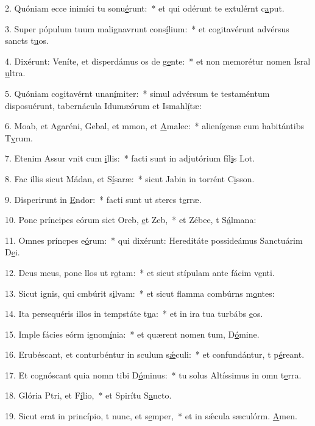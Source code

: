 2. Quóniam ecce inimíci tu sonu\uline{é}runt:~* et qui odérunt te extulérnt c\uline{a}put.\par 
3. Super pópulum tuum malignavrunt cons\uline{í}lium:~* et cogitavérunt advérsus sancts t\uline{u}os.\par 
4. Dixérunt: Veníte, et disperdámus os de g\uline{e}nte:~* et non memorétur nomen Isral \uline{u}ltra.\par 
5. Quóniam cogitavérnt unan\uline{í}miter:~* simul advérsum te testaméntum disposuérunt, tabernácula Idumæórum et Ismahl\uline{í}tæ:\par 
6. Moab, et Agaréni, Gebal, et mmon, et \uline{A}malec:~* alienígenæ cum habitántibs T\uline{y}rum.\par 
7. Etenim Assur vnit cum \uline{i}llis:~* facti sunt in adjutórium fíl\uline{i}s Lot.\par 
8. Fac illis sicut Mádan, et S\uline{í}saræ:~* sicut Jabin in torrént C\uline{i}sson.\par 
9. Disperirunt in \uline{E}ndor:~* facti sunt ut stercs t\uline{e}rræ.\par 
10. Pone príncipes eórum sict Oreb, \uline{e}t Zeb,~* et Zébee, t S\uline{á}lmana:\par 
11. Omnes príncpes e\uline{ó}rum:~* qui dixérunt: Hereditáte possideámus Sanctuárim D\uline{e}i.\par 
12. Deus meus, pone llos ut r\uline{o}tam:~* et sicut stípulam ante fácim v\uline{e}nti.\par 
13. Sicut ignis, qui cmbúrit s\uline{i}lvam:~* et sicut flamma combúrns m\uline{o}ntes:\par 
14. Ita persequéris illos in tempstáte t\uline{u}a:~* et in ira tua turbábs \uline{e}os.\par 
15. Imple fácies eórm ignom\uline{í}nia:~* et quærent nomen tum, D\uline{ó}mine.\par 
16. Erubéscant, et conturbéntur in sculum s\uline{ǽ}culi:~* et confundántur, t p\uline{é}reant.\par 
17. Et cognóscant quia nomn tibi D\uline{ó}minus:~* tu solus Altíssimus in omn t\uline{e}rra.\par 
18. Glória Ptri, et F\uline{í}lio,~* et Spirítu S\uline{a}ncto.\par 
19. Sicut erat in princípio, t nunc, et s\uline{e}mper,~* et in sǽcula sæculórm. \uline{A}men.\par 

